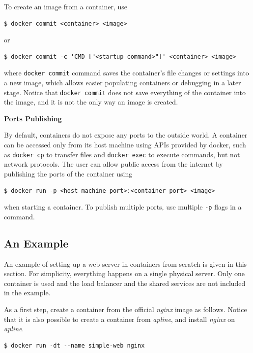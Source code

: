To create an image from a container, use
\begin{lstlisting}
$ docker commit <container> <image>
\end{lstlisting}
or
\begin{lstlisting}
$ docker commit -c 'CMD ["<startup command>"]' <container> <image>
\end{lstlisting}
where \verb|docker commit| command saves the container's file changes or settings into a new image, which allows easier populating containers or debugging in a later stage. Notice that \verb|docker commit| does not save everything of the container into the image, and it is not the only way an image is created.

\vspace{0.1in}
\noindent \textbf{Ports Publishing}
\vspace{0.1in}

By default, containers do not expose any ports to the outside world. A container can be accessed only from its host machine using APIs provided by docker, such as \verb|docker cp| to transfer files and \verb|docker exec| to execute commands, but not network protocols. The user can allow public access from the internet by publishing the ports of the container using
\begin{lstlisting}
$ docker run -p <host machine port>:<container port> <image>
\end{lstlisting}
when starting a container. To publish multiple ports, use multiple \verb|-p| flags in a command.

\subsection{An Example}

An example of setting up a web server in containers from scratch is given in this section. For simplicity, everything happens on a single physical server. Only one container is used and the load balancer and the shared services are not included in the example.

As a first step, create a container from the official \textit{nginx} image as follows. Notice that it is also possible to create a container from \textit{apline}, and install \textit{nginx} on \textit{apline}.
\begin{lstlisting}
$ docker run -dt --name simple-web nginx
\end{lstlisting}

